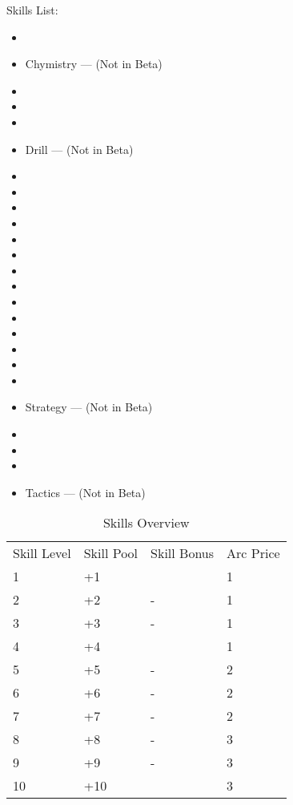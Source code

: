 \documentclass[oneside,11pt,english]{book}
\begin{document}
Skills List:
\begin{itemize}\itemsep1pt
	\item {}
	\item Chymistry --- (Not in Beta)
	\item {}
	\item {}
	\item {}
	\item Drill --- (Not in Beta)
	\item {}
	\item {}
	\item {}
	\item {}
	\item {}
	\item {}
	\item {}
	\item {}
	\item {}
	\item {}
	\item {}
	\item {}
	\item {}
	\item {}
	\item Strategy --- (Not in Beta)
	\item {}
	\item {}
	\item {}
	\item Tactics --- (Not in Beta)
\end{itemize}

\begin{table}[!ht]
	\centering
	\caption{Skills Overview}
	\label{tab:Skill Levels Overview}
	\centering
		\begin{tabu} spread 0pt{X[c]X[c]XX[c]}
	Skill Level&Skill Pool&	Skill Bonus&Arc Price\\
	1&			+1&			&	1\\
	2&			+2&			-&			1\\
	3&			+3&			-&			1\\
	4&			+4&			&	1\\
	5&			+5&			-&			2\\
	6&			+6&			-&			2\\
	7&			+7&			-&			2\\
	8&			+8&			-&			3\\
	9&			+9&			-&			3\\
	10&			+10&		&3\\
		\end{tabu}
\end{table}
\end{document}
